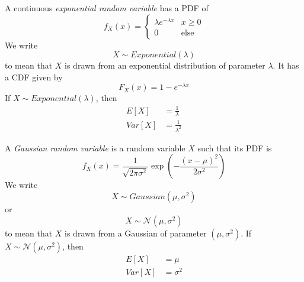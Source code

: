 A continuous \emph{exponential random variable}
has a PDF of
\begin{equation}
    f_X(x) = \begin{cases}
        \lambda e^{-\lambda x} & x \geq 0    \\
        0                      & \text{else}
    \end{cases}
\end{equation}
We write
\begin{equation}
    X \sim Exponential(\lambda)
\end{equation}
to mean that $X$ is drawn from an
exponential distribution of parameter
$\lambda$. It has a CDF given by
\begin{equation}
    F_X(x) = 1 - e^{-\lambda x}
\end{equation}
If $X \sim Exponential(\lambda)$, then
\begin{align}
    E[X]   & = \frac{1}{\lambda}   \\
    Var[X] & = \frac{1}{\lambda^2}
\end{align}

A \emph{Gaussian random variable} is a
random variable $X$ such that its PDF
is
\begin{equation}
    f_X(x) = \frac{1}{\sqrt{2\pi \sigma^2}}\exp\left(-\frac{(x-\mu)^2}{2\sigma^2}\right)
\end{equation}
We write
\begin{equation}
    X \sim Gaussian(\mu, \sigma^2)
\end{equation}
or
\begin{equation}
    X \sim \mathcal{N}\left(\mu, \sigma^2\right)
\end{equation}
to mean that $X$ is drawn from a Gaussian
of parameter $(\mu, \sigma^2)$.
If $X \sim \mathcal{N}(\mu, \sigma^2)$, then
\begin{align}
    E[X]   & = \mu      \\
    Var[X] & = \sigma^2
\end{align}

